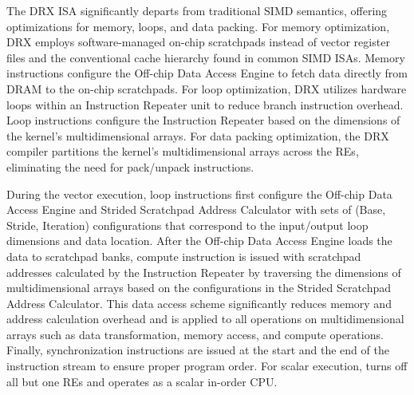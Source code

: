 %
%
The DRX ISA significantly departs from traditional SIMD semantics, offering optimizations for memory, loops, and data packing. 
%
For memory optimization, DRX employs software-managed on-chip scratchpads instead of vector register files and the conventional cache hierarchy found in common SIMD ISAs. 
%
Memory instructions configure the Off-chip Data Access Engine to fetch data directly from DRAM to the on-chip scratchpads. 
%
For loop optimization, DRX utilizes hardware loops within an Instruction Repeater unit to reduce branch instruction overhead. 
%
Loop instructions configure the Instruction Repeater based on the dimensions of the kernel's multidimensional arrays. 
%
For data packing optimization, the DRX compiler partitions the kernel's multidimensional arrays across the REs, eliminating the need for pack/unpack instructions.


During the vector execution, loop instructions first configure the Off-chip Data Access Engine and Strided Scratchpad Address Calculator with sets of (Base, Stride, Iteration) configurations that correspond to the input/output loop dimensions and data location. 
%
After the Off-chip Data Access Engine loads the data to scratchpad banks, compute instruction is issued with scratchpad addresses calculated by the Instruction Repeater by traversing the dimensions of multidimensional arrays based on the configurations in the Strided Scratchpad Address Calculator. 
%
This data access scheme significantly reduces memory and address calculation overhead and is applied to all operations on multidimensional arrays such as data transformation, memory access, and compute operations. 
%
Finally, synchronization instructions are issued at the start and the end of the instruction stream to ensure proper program order. For scalar execution, \drx turns off all but one REs and operates as a scalar in-order CPU. 


